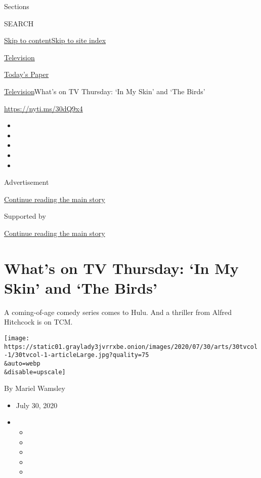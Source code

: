 Sections

SEARCH

\protect\hyperlink{site-content}{Skip to
content}\protect\hyperlink{site-index}{Skip to site index}

\href{https://www.nytimes3xbfgragh.onion/section/arts/television}{Television}

\href{https://myaccount.nytimes3xbfgragh.onion/auth/login?response_type=cookie\&client_id=vi}{}

\href{https://www.nytimes3xbfgragh.onion/section/todayspaper}{Today's
Paper}

\href{/section/arts/television}{Television}\textbar{}What's on TV
Thursday: `In My Skin' and `The Birds'

\url{https://nyti.ms/30dQ9x4}

\begin{itemize}
\item
\item
\item
\item
\item
\end{itemize}

Advertisement

\protect\hyperlink{after-top}{Continue reading the main story}

Supported by

\protect\hyperlink{after-sponsor}{Continue reading the main story}

\hypertarget{whats-on-tv-thursday-in-my-skin-and-the-birds}{%
\section{What's on TV Thursday: `In My Skin' and `The
Birds'}\label{whats-on-tv-thursday-in-my-skin-and-the-birds}}

A coming-of-age comedy series comes to Hulu. And a thriller from Alfred
Hitchcock is on TCM.

\texttt{[image: https://static01.graylady3jvrrxbe.onion/images/2020/07/30/arts/30tvcol-1/30tvcol-1-articleLarge.jpg?quality=75\\\&auto=webp\\\&disable=upscale]}

By Mariel Wamsley

\begin{itemize}
\item
  July 30, 2020
\item
  \begin{itemize}
  \item
  \item
  \item
  \item
  \item
  \end{itemize}
\end{itemize}

